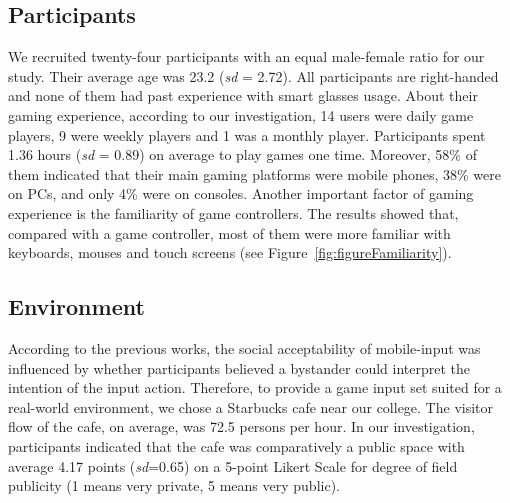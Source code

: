 \documentclass{sigchi}
\begin{document}
  \subsection {Participants}
  We recruited twenty-four participants with an equal male-female ratio for our study. Their average age was 23.2 (\textsl{sd} = 2.72). All participants are right-handed and none of them had past experience with smart glasses usage. About their gaming experience, according to our investigation, 14 users were daily game players, 9 were weekly players and 1 was a monthly player. Participants spent 1.36 hours (\textsl{sd} = 0.89) on average to play games one time. Moreover, 58\% of them indicated that their main gaming platforms were mobile phones, 38\% were on PCs, and only 4\% were on consoles. Another important factor of gaming experience is the familiarity of game controllers. The results showed that, compared with a game controller, most of them were more familiar with keyboards, mouses and touch screens (see Figure~\ref{fig:figureFamiliarity}).
 

  \subsection {Environment}
  According to the previous works\cite{Williamson:2013:MEM:2522848.2522874,Montero:2010:YUS:1851600.1851647}, the social acceptability of mobile-input was influenced by whether participants believed a bystander could interpret the intention of the input action. Therefore, to provide a game input set suited for a real-world environment, we chose a Starbucks cafe near our college. The visitor flow of the cafe, on average, was 72.5 persons per hour. In our investigation, participants indicated that the cafe was comparatively a public space with average 4.17 points (\textsl{sd}=0.65) on a 5-point Likert Scale for degree of field publicity (1 means very private, 5 means very public).    
\end{document}

